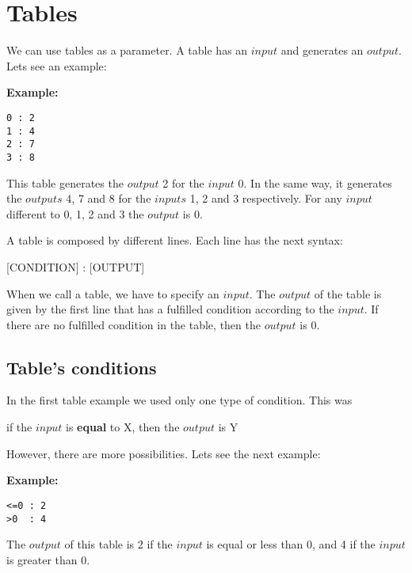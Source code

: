\documentclass[11pt,a4paper,openright,oneside]{book}
\newenvironment{ex}
{
  \setlength{\parindent}{0cm}
  \large \textbf{Example:} \normalsize 
}
{}
\begin{document}
\section{Tables}

We can use \textsf{tables} as a parameter. A \textsf{table} has an $input$ and generates an $output$. Lets see an example:

\begin{ex} 
  \begin{lstlisting}
0 : 2
1 : 4
2 : 7
3 : 8 
  \end{lstlisting}
  This table generates the $output$ \textsf{2} for the $input$ \textsf{0}. In the same way, it generates the $outputs$ \textsf{4, 7} and  \textsf{8} for the $inputs$ \textsf{1, 2} and \textsf{3} respectively. For any $input$ different to \textsf{0, 1, 2} and \textsf{3} the $output$ is \textsf{0}.
\end{ex}

  A table is composed by different lines. Each line has the next syntax:
  
\begin{center} \textsf{\textsc{\scriptsize[CONDITION]} : \textsc{\scriptsize[OUTPUT]}} \normalsize \end{center}

  When we call a table, we have to specify an $input$. The $output$ of the table is given by the first line that has a fulfilled \textsf{condition} according to the $input$. If there are no fulfilled \textsf{condition} in the table, then the $output$ is \textsf{0}.

\subsection{Table's conditions}

  In the first table example we used only one type of condition. This was

\begin{center} if the $input$ is \textbf{equal} to \textsc{X}, then the $output$ is \textsc{Y} \end{center}

  However, there are more possibilities. Lets see the next example:
 
\begin{ex} 
  \begin{lstlisting} 
<=0 : 2 
>0  : 4 
  \end{lstlisting}

  The $output$ of this table is \textsf{2} if the $input$ is equal or less than \textsf{0}, and \textsf{4} if the $input$ is greater than \textsf{0}.
  \end{ex}
\end{document}
